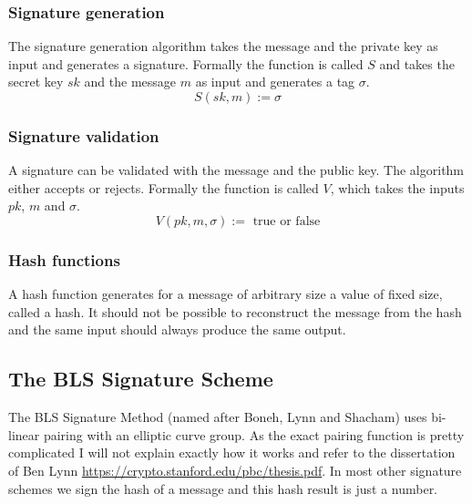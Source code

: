 \documentclass[a4paper,12pt]{scrartcl}
\begin{document}
\subsubsection{Signature generation}

The signature generation algorithm takes the message and the private key as input and generates a signature. Formally the function is called $S$ and takes the secret key $sk$ and the message $m$ as input and generates a tag $\sigma$.
\[
S(sk, m) := \sigma
\]

\subsubsection{Signature validation}

A signature can be validated with the message and the public key. The algorithm either accepts or rejects. Formally the function is called $V$, which takes the inputs $pk$, $m$ and $\sigma$.
\[
V(pk, m, \sigma) := \text{ true or false}
\]

\subsubsection{Hash functions}

A hash function generates for a message of arbitrary size a value of fixed size, called a hash. It should not be possible to reconstruct the message from the hash and the same input should always produce the same output.

\subsection{The BLS Signature Scheme}
The BLS Signature Method (named after Boneh, Lynn and Shacham) uses bi-linear pairing with an elliptic curve group. As the exact pairing function is pretty complicated I will not explain exactly how it works and refer to the dissertation of Ben Lynn \url{https://crypto.stanford.edu/pbc/thesis.pdf}. In most other signature schemes we sign the hash of a message and this hash result is just a number. 
\end{document}
